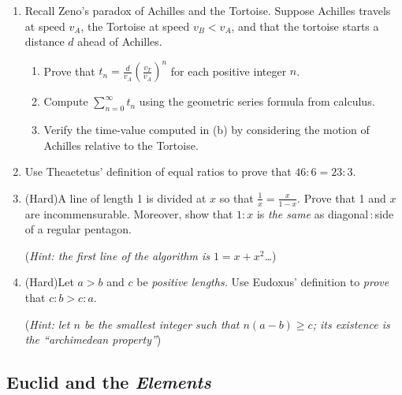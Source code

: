 \begin{exercises}{}{}
\begin{enumerate}
		
		\item\label{exs:zenoachilles} Recall Zeno's paradox of Achilles and the Tortoise. Suppose Achilles travels at speed $v_A$, the Tortoise at speed $v_B<v_A$, and that the tortoise starts a distance $d$ ahead of Achilles.
		\begin{enumerate}
		  \item Prove that $t_n=\frac d{v_A}\left(\frac{v_T}{v_A}\right)^{n}$ for each positive integer $n$.
		  \item Compute $\sum_{n=0}^\infty t_n$ using the geometric series formula from calculus.
		  \item Verify the time-value computed in (b) by considering the motion of Achilles relative to the Tortoise.
		\end{enumerate} 
		
	  
	  \item%
		Use Theaetetus' definition of equal ratios to prove that $46:6=23:3$.
	  
	  
	  \item%
	  (Hard)\lstsp A line of length 1 is divided at $x$ so that $\frac 1x=\frac x{1-x}$. Prove that 1 and $x$ are incommensurable. Moreover, show that $1:x$ is \emph{the same} as diagonal\,:\,side of a regular pentagon.\par
	  (\emph{Hint: the first line of the algorithm is $1=x+x^2$\ldots})
	  
	  
	  \item%
	  (Hard)\lstsp Let $a>b$ and $c$ be \emph{positive lengths.} Use Eudoxus' definition to \emph{prove} that $c:b>c:a$.\par
	  (\emph{Hint: let $n$ be the smallest integer such that $n(a-b)\ge c$; its existence is the ``archimedean property''})
	\end{enumerate}
\end{exercises}


\clearpage




\subsection{Euclid and the \emph{Elements}}

